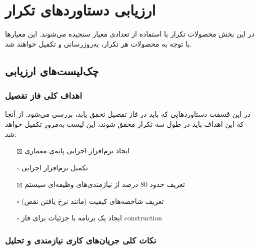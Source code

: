\chapter{ارزیابی دستاوردهای تکرار}
در این بخش محصولات تکرار با استفاده از تعدادی معیار سنجیده می‌شوند. این معیارها با توجه به محصولات هر تکرار، به‌روزرسانی و تکمیل خواهند شد.
\section{چک‌لیست‌های ارزیابی}

\iffalse
Item icons for checklists:	
	\item[$\square$]
	\item[$\boxtimes$]
\fi

\subsection{اهداف کلی فاز تفصیل}
در این قسمت دستاوردهایی که باید در فاز تفصیل تحقق یابد، بررسی می‌شود. از آنجا که این اهداف باید در طول سه تکرار محقق شوند، این لیست به‌مرور تکمیل خواهد شد:
\begin{itemize} %
	\item[$\boxtimes$]
	ایجاد نرم‌افزار اجرایی پایه‌ی معماری
	\item[$\square$]
	تکمیل نرم‌افزار اجرایی
	\item[$\boxtimes$]
	تعریف حدود 80 درصد از نیازمندی‌های وظیفه‌ای سیستم
	\item[$\square$]
	تعریف شاخصه‌های کیفیت (مانند نرخ یافتن نقص)
	\item[$\square$]
	ایجاد یک برنامه با جزئیات برای فاز construction
	
\end{itemize}

\subsection{نکات کلی جریان‌های کاری نیازمندی و تحلیل}

